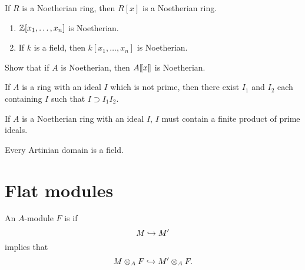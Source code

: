 \documentclass{ximera}
\begin{document}
\begin{theorem}
  If $R$ is a Noetherian ring, then $R[x]$ is a Noetherian ring.
\end{theorem}

\begin{corollary}\hfill\begin{enumerate}
\item $\mathbb Z[x_1,\dots,x_n]$ is Noetherian.
\item If $k$ is a field, then $k[x_1,\dots,x_n]$ is Noetherian.
\end{enumerate}
\end{corollary}


\begin{exercise} Show that if $A$ is Noetherian, then $A[\hspace{-0.25ex}[ x]\hspace{-0.25ex}]$ is Noetherian.
\end{exercise}


\begin{lemma} If $A$ is a ring with an ideal $I$ which is not prime, then there exist $I_1$ and $I_2$ each containing $I$ such that $I\supset I_1I_2$.
\end{lemma}

\begin{lemma} If $A$ is a Noetherian ring with an ideal $I$, $I$ must contain a finite product of prime ideals.
\end{lemma}

\begin{lemma} Every Artinian domain is a field.
\end{lemma}








\section{Flat modules}

\begin{definition} An $A$-module $F$ is  if 
\[
M\hookrightarrow M'
\]
implies that
\[
M\otimes_A F \hookrightarrow M'\otimes_A F.
\]
\end{definition}
\end{document}
